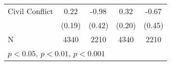 \begin{table}[htbp]
\begin{tabular}{l*{4}{c}}
Civil Conflict      &        0.22         &       -0.98\sym{*}  &        0.32         &       -0.67         \\
                    &      (0.19)         &      (0.42)         &      (0.20)         &      (0.45)         \\
\hline
N                   &        4340         &        2210         &        4340         &        2210         \\
\hline\hline
\multicolumn{5}{l}{\footnotesize \sym{*} \(p<0.05\), \sym{**} \(p<0.01\), \sym{***} \(p<0.001\)}\\
\end{tabular}
\end{table}
